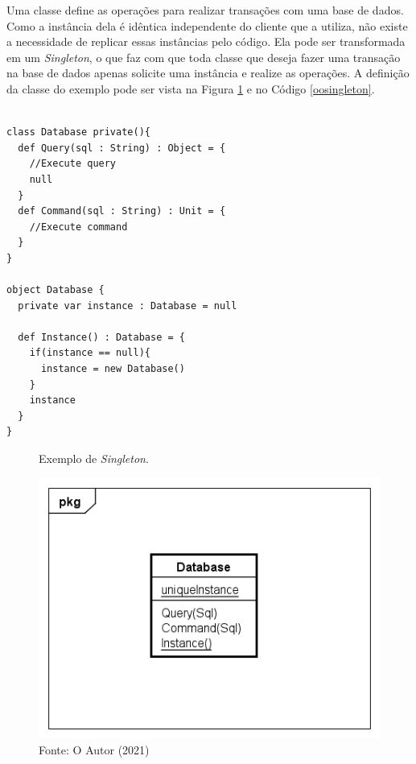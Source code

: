 Uma classe define as operações para realizar transações com 
uma base de dados. Como a instância dela é idêntica independente 
do cliente que a utiliza, não existe a necessidade de replicar 
essas instâncias pelo código. Ela pode ser transformada em 
um \textit{Singleton}, o que faz com que toda classe que deseja fazer 
uma transação na base de dados apenas solicite uma instância 
e realize as operações. A definição da classe do exemplo 
pode ser vista na Figura \ref{singleton_exemplo} e no 
Código \ref{oosingleton}.

\begin{lstlisting}[caption={\textit{Singleton} Orientação a Objetos.},label=oosingleton]

class Database private(){
  def Query(sql : String) : Object = {
    //Execute query
    null
  }
  def Command(sql : String) : Unit = {
    //Execute command
  }
}

object Database {
  private var instance : Database = null

  def Instance() : Database = {
    if(instance == null){
      instance = new Database()
    }
    instance
  }
}

\end{lstlisting}

\begin{figure}[htb]
	\caption{\label{singleton_exemplo}Exemplo de \textit{Singleton}.}
	\begin{center}
	    \includegraphics[scale=0.6]{5_padroes-contexto-funcional/5.1_criacionais/5.1.5_singleton/singleton_exemplo.png}
	\end{center}
  \caption*{Fonte: O Autor (2021)}
\end{figure}

